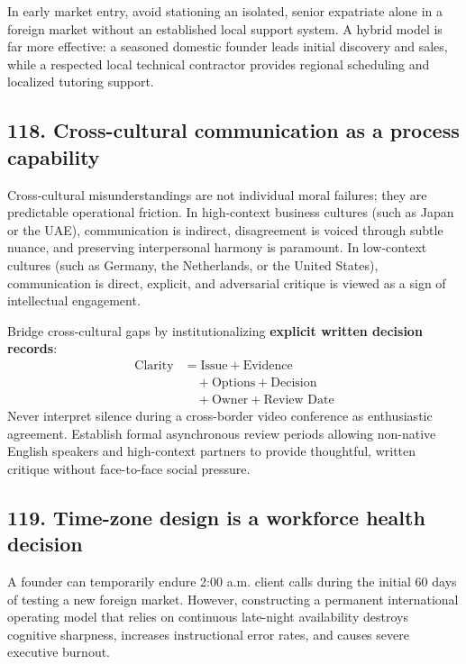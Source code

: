 In early market entry, avoid stationing an isolated, senior expatriate alone in a foreign market without an established local support system. A hybrid model is far more effective: a seasoned domestic founder leads initial discovery and sales, while a respected local technical contractor provides regional scheduling and localized tutoring support.

\subsection{118. Cross-cultural communication as a process capability}

Cross-cultural misunderstandings are not individual moral failures; they are predictable operational friction. In high-context business cultures (such as Japan or the UAE), communication is indirect, disagreement is voiced through subtle nuance, and preserving interpersonal harmony is paramount. In low-context cultures (such as Germany, the Netherlands, or the United States), communication is direct, explicit, and adversarial critique is viewed as a sign of intellectual engagement.

Bridge cross-cultural gaps by institutionalizing \textbf{explicit written decision records}:
\begin{equation}
\begin{aligned}
\text{Clarity} &= \text{Issue} + \text{Evidence} \\
&\quad + \text{Options} + \text{Decision} \\
&\quad + \text{Owner} + \text{Review Date}
\end{aligned}
\end{equation}
Never interpret silence during a cross-border video conference as enthusiastic agreement. Establish formal asynchronous review periods allowing non-native English speakers and high-context partners to provide thoughtful, written critique without face-to-face social pressure.

\subsection{119. Time-zone design is a workforce health decision}

A founder can temporarily endure 2:00 a.m. client calls during the initial 60 days of testing a new foreign market. However, constructing a permanent international operating model that relies on continuous late-night availability destroys cognitive sharpness, increases instructional error rates, and causes severe executive burnout.

